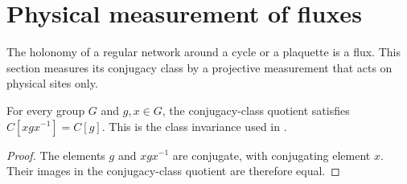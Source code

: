\section{Physical measurement of fluxes}%
\label{sec:peps_flux_measurement}

The holonomy of a regular network around a cycle or a plaquette is a flux.
This section measures its conjugacy class by a projective measurement that
acts on physical sites only.

\begin{lemma}%
    \label{thm:peps_conjugacy_class_invariance}
    \leanok
    For every group $G$ and $g,x\in G$, the conjugacy-class quotient satisfies
    $C[xgx^{-1}]=C[g]$. This is the class invariance used in
    \cite[Theorem 6.15 and Section 6.6]{Schuch2010PEPS}.
\end{lemma}
\begin{proof}\leanok
    The elements $g$ and $xgx^{-1}$ are conjugate, with conjugating element $x$.
    Their images in the conjugacy-class quotient are therefore equal.
\end{proof}
